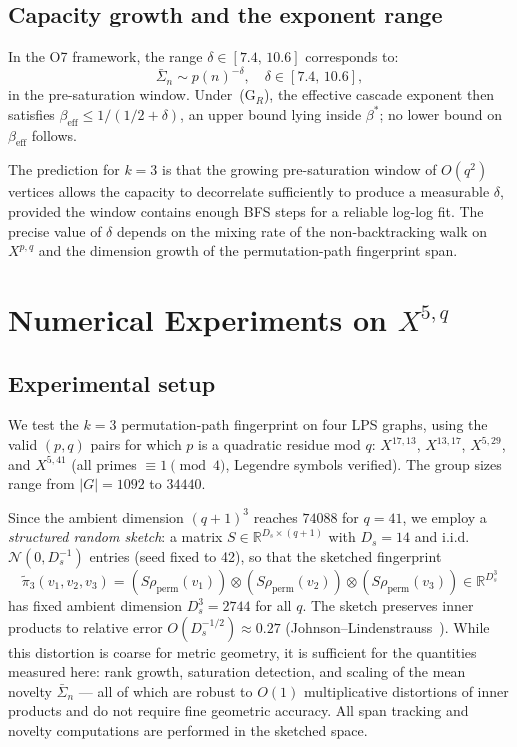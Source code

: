 \documentclass[11pt,a4paper]{article}
\theoremstyle{definition}
\theoremstyle{remark}
\newcommand{\R}{\mathbb{R}}
\newcommand{\bSigma}{\bar{\Sigma}}
\newcommand{\betaeff}{\beta_{\mathrm{eff}}}
\newcommand{\perm}{\mathrm{perm}}
\begin{document}
  \subsection{Capacity growth and the exponent range}
    \label{sec:capacity-growth}

    In the O7 framework, the range $\delta \in [7.4,\,10.6]$ corresponds to:
    \[
      \bSigma_n \sim p(n)^{-\delta}, \quad \delta \in [7.4,\,10.6],
    \]
    in the pre-saturation window.
    Under~(G$_R$), the effective cascade exponent then satisfies $\betaeff \leq 1/(1/2 + \delta)$, an
    upper bound lying inside $\beta^*$; no lower bound on $\betaeff$ follows.

    The prediction for $k = 3$ is that the growing pre-saturation window of $O(q^2)$
    vertices allows the capacity to decorrelate sufficiently to produce a measurable $\delta$,
    provided the window contains enough BFS steps for a reliable log-log fit.
    The precise value of $\delta$ depends on the mixing rate of the non-backtracking walk
    on $X^{p,q}$ and the dimension growth of the permutation-path fingerprint span.

  \section{Numerical Experiments on $X^{5,q}$}
  \label{sec:numerics}

  \subsection{Experimental setup}
    \label{sec:numerics-setup}

    We test the $k = 3$ permutation-path fingerprint on four LPS graphs, using the valid
    $(p,q)$ pairs for which $p$ is a quadratic residue mod $q$:
    $X^{17,13}$, $X^{13,17}$, $X^{5,29}$, and $X^{5,41}$
    (all primes $\equiv 1 \pmod 4$, Legendre symbols verified).
    The group sizes range from $|G| = 1092$ to $34440$.

    Since the ambient dimension $(q+1)^3$ reaches $74088$ for $q = 41$, we employ a
    \emph{structured random sketch}: a matrix $S \in \R^{D_s \times (q+1)}$
    with $D_s = 14$ and i.i.d.\ $\mathcal{N}(0, D_s^{-1})$ entries (seed fixed to 42),
    so that the sketched fingerprint
    \[
      \tilde\pi_3(v_1,v_2,v_3)
      = (S\rho_\perm(v_1)) \otimes (S\rho_\perm(v_2)) \otimes (S\rho_\perm(v_3))
      \in \R^{D_s^3}
    \]
    has fixed ambient dimension $D_s^3 = 2744$ for all $q$.
    The sketch preserves inner products to relative error $O(D_s^{-1/2}) \approx 0.27$
    (Johnson--Lindenstrauss~\cite{JL}).
    While this distortion is coarse for metric geometry, it is sufficient for the
    quantities measured here: rank growth, saturation detection, and scaling of the
    mean novelty $\bSigma_n$ — all of which are robust to $O(1)$ multiplicative
    distortions of inner products and do not require fine geometric accuracy.
    All span tracking and novelty computations are performed in the sketched space.
\end{document}
